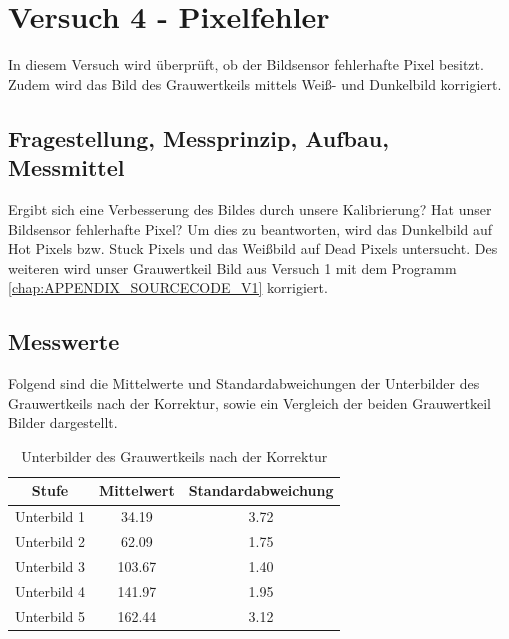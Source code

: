 \documentclass[12pt,oneside,a4paper]{report}
\begin{document}
\chapter{Versuch 4 - Pixelfehler}
\label{chap:VERSUCH_4}

In diesem Versuch wird überprüft, ob der Bildsensor fehlerhafte Pixel besitzt.
Zudem wird das Bild des Grauwertkeils mittels Weiß- und Dunkelbild korrigiert.

\section{Fragestellung, Messprinzip, Aufbau, Messmittel}
\label{chap:VERSUCH_4_FRAGESTELLUNG}

Ergibt sich eine Verbesserung des Bildes durch unsere Kalibrierung? Hat unser Bildsensor fehlerhafte Pixel? Um dies zu beantworten, wird das Dunkelbild auf Hot Pixels bzw. Stuck Pixels und das Weißbild auf Dead Pixels untersucht.
Des weiteren wird unser Grauwertkeil Bild aus Versuch 1 mit dem Programm \ref{chap:APPENDIX_SOURCECODE_V1} korrigiert.

\section{Messwerte}
\label{chap:VERSUCH_4_MESSWERTE}

Folgend sind die Mittelwerte und Standardabweichungen der Unterbilder des Grauwertkeils nach der Korrektur, sowie ein Vergleich der beiden Grauwertkeil Bilder dargestellt.

\begin{table}[H]
\centering 
\begin{tabular}{ccc}
\hline
\textbf{Stufe} &\textbf{ Mittelwert} & \textbf{Standardabweichung} \\
\hline
Unterbild 1 & 34.19 & 3.72 \\
\hline
Unterbild 2 & 62.09 & 1.75 \\
\hline
Unterbild 3 & 103.67 & 1.40 \\
\hline
Unterbild 4 & 141.97 & 1.95 \\
\hline
Unterbild 5 & 162.44 & 3.12 \\
\hline
\end{tabular} 
\caption{Unterbilder des Grauwertkeils nach der Korrektur}
\label{tab:UNTERBILDER_KOR}
\end{table}
\end{document}
